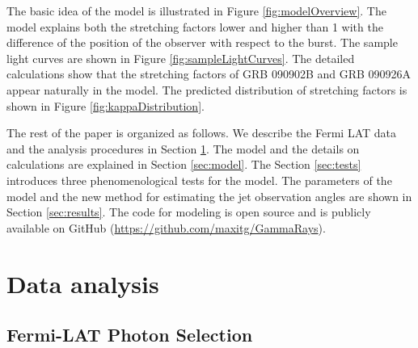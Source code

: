 \documentclass{article}
\begin{document}
The basic idea of the model is illustrated in Figure
\ref{fig:modelOverview}. The model explains both the stretching
factors lower and higher than 1 with the difference of the position of
the observer with respect to the burst. The sample light curves are
shown in Figure \ref{fig:sampleLightCurves}. The detailed calculations
show that the stretching factors of GRB 090902B and GRB 090926A appear
naturally in the model. The predicted distribution of stretching
factors is shown in Figure \ref{fig:kappaDistribution}.

The rest of the paper is organized as follows. We describe the Fermi
LAT data and the analysis procedures in Section
\ref{sec:observations}. The model and the details on calculations are
explained in Section \ref{sec:model}. The Section \ref{sec:tests}
introduces three phenomenological tests for the model. The parameters
of the model and the new method for estimating the jet observation
angles are shown in Section \ref{sec:results}. The code for modeling
is open source and is publicly available on GitHub
(\url{https://github.com/maxitg/GammaRays}).

\section{Data analysis}
\label{sec:observations}

\subsection{Fermi-LAT Photon Selection}
\label{sec:photonSelection}
\end{document}
